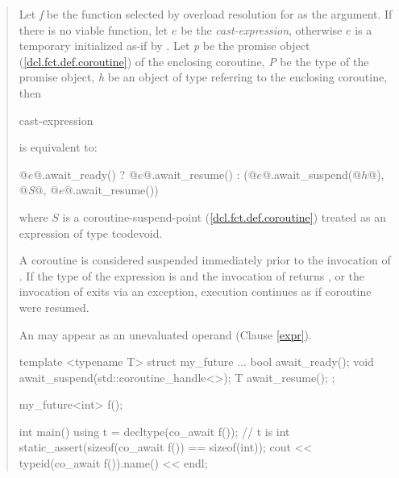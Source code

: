 \begin{quote}
\begin{itemize}
\end{itemize}


\pnum
Let \textit{f} be the  function selected by overload resolution for  as the argument. 
If there is no viable function, let $e$ be the \textit{cast-expression}, otherwise $e$ is a temporary initialized as-if by .
Let \textit{p} be the promise object (\ref{dcl.fct.def.coroutine})
of the enclosing coroutine, \textit{P} be the type of the promise object, \textit{h} be an object of type   referring to the enclosing coroutine, then


\begin{ncbnf}
   cast-expression
\end{ncbnf}
is equivalent to:

\begin{codeblock}
  @$e$@.await_ready() ? @$e$@.await_resume() : (@$e$@.await_suspend(@$h$@), @\textit{S}@, @$e$@.await_resume())
\end{codeblock}
where $S$ is a coroutine-suspend-point (\ref{dcl.fct.def.coroutine}) treated as an expression of type tcode{void}.

\pnum
A coroutine is considered suspended immediately prior to  the invocation of . If the type of the expression  is  and the invocation of  returns , or the invocation of  exits via an exception, execution continues as if coroutine were resumed. 


\pnum
\enternote
An  may appear as an unevaluated operand (Clause \ref{expr}). 
\enterexample
\begin{codeblock}	
  template <typename T>
  struct my_future {
    ...
    bool await_ready();
    void await_suspend(std::coroutine_handle<>);
    T await_resume();
  };
  
  my_future<int> f();
  
  int main() {
    using t = decltype(co_await f()); // t is int
    static_assert(sizeof(co_await f()) == sizeof(int));
    cout << typeid(co_await f()).name() << endl;
  }
\end{codeblock}
\exitexample%
\exitnote

\end{quote}

